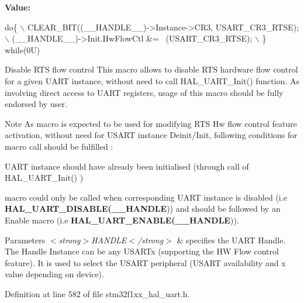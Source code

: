 {\bfseries Value\+:}
\begin{DoxyCode}
\textcolor{keywordflow}{do}\{                                                      \(\backslash\)
    CLEAR\_BIT((\_\_HANDLE\_\_)->Instance->CR3, USART\_CR3\_RTSE);\(\backslash\)
    (\_\_HANDLE\_\_)->Init.HwFlowCtl &= ~(USART\_CR3\_RTSE);     \(\backslash\)
  \} \textcolor{keywordflow}{while}(0U)
\end{DoxyCode}


Disable R\+TS flow control This macro allows to disable R\+TS hardware flow control for a given U\+A\+RT instance, without need to call H\+A\+L\+\_\+\+U\+A\+R\+T\+\_\+\+Init() function. As involving direct access to U\+A\+RT registers, usage of this macro should be fully endorsed by user. 

\begin{DoxyNote}{Note}
As macro is expected to be used for modifying R\+TS Hw flow control feature activation, without need for U\+S\+A\+RT instance Deinit/\+Init, following conditions for macro call should be fulfilled \+:
\begin{DoxyItemize}
\item U\+A\+RT instance should have already been initialised (through call of H\+A\+L\+\_\+\+U\+A\+R\+T\+\_\+\+Init() )
\item macro could only be called when corresponding U\+A\+RT instance is disabled (i.\+e {\bfseries H\+A\+L\+\_\+\+U\+A\+R\+T\+\_\+\+D\+I\+S\+A\+B\+LE(\+\_\+\+\_\+\+H\+A\+N\+D\+LE})) and should be followed by an Enable macro (i.\+e {\bfseries H\+A\+L\+\_\+\+U\+A\+R\+T\+\_\+\+E\+N\+A\+B\+LE(\+\_\+\+\_\+\+H\+A\+N\+D\+LE})). 
\end{DoxyItemize}
\end{DoxyNote}

\begin{DoxyParams}{Parameters}
{\em $<$strong$>$\+H\+A\+N\+D\+L\+E$<$/strong$>$} & specifies the U\+A\+RT Handle. The Handle Instance can be any U\+S\+A\+R\+Tx (supporting the HW Flow control feature). It is used to select the U\+S\+A\+RT peripheral (U\+S\+A\+RT availability and x value depending on device). \\
\hline
\end{DoxyParams}


Definition at line 582 of file stm32f1xx\+\_\+hal\+\_\+uart.\+h.

\mbox{\label{group___u_a_r_t___exported___macros_ga017ec9001ff33136f87cc4034b2709a6}} 
